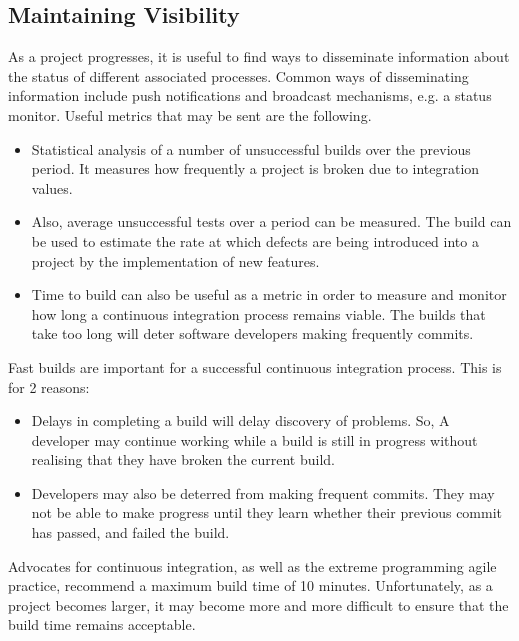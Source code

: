 \documentclass[a4paper, openany]{memoir}
\begin{document}
\subsection{Maintaining Visibility}
As a project progresses, it is useful to find ways to disseminate information about the status of different associated processes. Common ways of disseminating information include push notifications and broadcast mechanisms, e.g. a status monitor. Useful metrics that may be sent are the following.
\begin{itemize}
    \item Statistical analysis of a number of unsuccessful builds over the previous period. It measures how frequently a project is broken due to integration values. 
    \item Also, average unsuccessful tests over a period can be measured. The build can be used to estimate the rate at which defects are being introduced into a project by the implementation of new features.
    \item Time to build can also be useful as a metric in order to measure and monitor how long a continuous integration process remains viable. The builds that take too long will deter software developers making frequently commits.
\end{itemize}

Fast builds are important for a successful continuous integration process. This is for 2 reasons:
\begin{itemize}
    \item Delays in completing a build will delay discovery of problems. So, A developer may continue working while a build is still in progress without realising that they have broken the current build.
    \item Developers may also be deterred from making frequent commits. They may not be able to make progress until they learn whether their previous commit has passed, and failed the build.
\end{itemize}

Advocates for continuous integration, as well as the extreme programming agile practice, recommend a maximum build time of 10 minutes. Unfortunately, as a project becomes larger, it may become more and more difficult to ensure that the build time remains acceptable.
\end{document}
